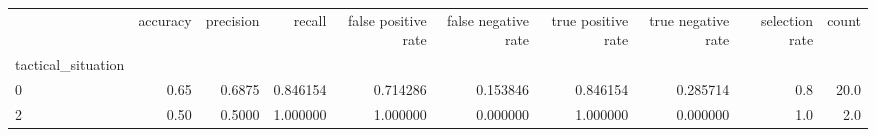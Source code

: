 \begin{tabular}{lrrrrrrrrr}
\toprule
{} &  accuracy &  precision &    recall &  false positive rate &  false negative rate &  true positive rate &  true negative rate &  selection rate &  count \\
tactical\_situation &           &            &           &                      &                      &                     &                     &                 &        \\
\midrule
0                  &      0.65 &     0.6875 &  0.846154 &             0.714286 &             0.153846 &            0.846154 &            0.285714 &             0.8 &   20.0 \\
2                  &      0.50 &     0.5000 &  1.000000 &             1.000000 &             0.000000 &            1.000000 &            0.000000 &             1.0 &    2.0 \\
\bottomrule
\end{tabular}
